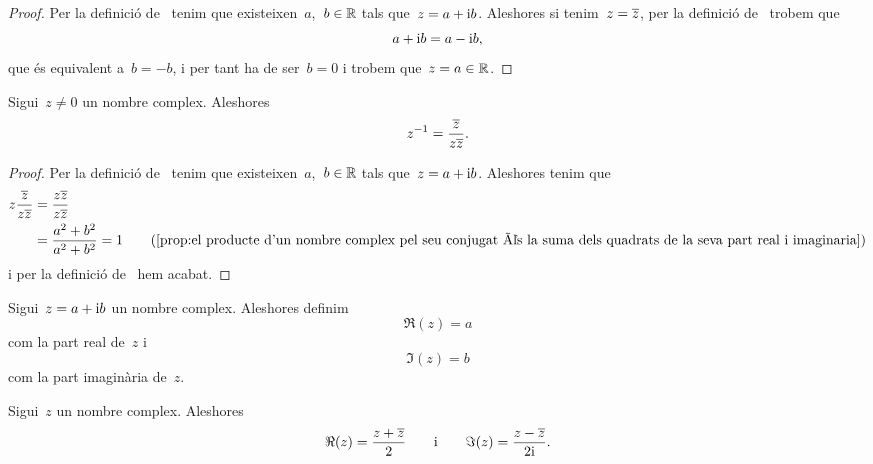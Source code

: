 \documentclass[../Apunts.tex]{subfiles}
\begin{document}
    \begin{proof}
        Per la definició de~ tenim que
        existeixen~\(a\),~\(b\in\mathbb{R}\) tals que~\(z=a+\mathrm{i} b\).
        Aleshores si tenim~\(z=\overline{z}\), per la definició
        de~ trobem que
        \[a+\mathrm{i} b=a-\mathrm{i} b,\]
        que és equivalent a~\(b=-b\), i per tant ha de ser~\(b=0\)
        i trobem que~\(z=a\in\mathbb{R}\).
    \end{proof}
    \begin{proposition}
        \label{prop:inversa d'un nombre complex en funció del seu conjugat}
        Sigui~\(z\neq0\) un nombre complex.
        Aleshores
        \[z^{-1}=\frac{\overline{z}}{z\overline{z}}.\]
    \end{proposition}
    \begin{proof}
        Per la definició de~ tenim que
        existeixen~\(a\),~\(b\in\mathbb{R}\) tals que~\(z=a+\mathrm{i} b\).
        Aleshores tenim que
        \begin{align*}
            z\frac{\conjugat{z}}{z\conjugat{z}}
            &=\frac{z\conjugat{z}}{z\conjugat{z}} \\
            &=\frac{a^{2}+b^{2}}{a^{2}+b^{2}}=1
            \tag{\ref{prop:el producte d'un nombre complex pel seu conjugat %
            és la suma dels quadrats de la seva part real i imaginaria}}
        \end{align*}
        i per la definició de~
        hem acabat.
    \end{proof}
    \begin{definition}
        \label{def:part real i part imaginària d'un nombre complex}
        \label{def:part real d'un nombre complex}
        \label{def:part imaginària d'un nombre complex}
        Sigui~\(z=a+\mathrm{i} b\) un nombre complex.
        Aleshores definim
        \[\Re(z)=a\]
        com la part real de~\(z\) i
        \[\Im(z)=b\]
        com la part imaginària de~\(z\).
    \end{definition}
    \begin{proposition}
        \label{prop:fórmules per la part real i part imaginària d'un nombre complex}
        \label{prop:fórmula per la part real d'un nombre complex}
        \label{prop:fórmula per la part imaginària d'un nombre complex}
        Sigui~\(z\) un nombre complex.
        Aleshores
        \[
            \Re(z)=\frac{z+\overline{z}}{2}
            \qquad\text{i}\qquad
            \Im(z)=\frac{z-\overline{z}}{2\mathrm{i}}.
        \]
    \end{proposition}
\end{document}
